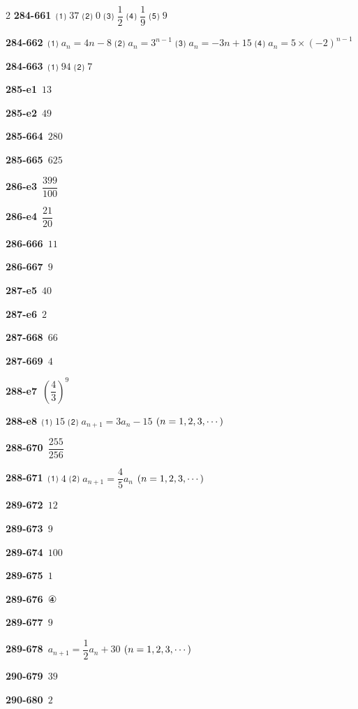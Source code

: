 \documentclass[10pt,a4paper]{article}
\begin{document}
\begin{multicols}{2}
\noindent\textbf{284-661}\ ⑴ $37$ ⑵ $0$ ⑶ $\dfrac{1}{2}$ ⑷ $\dfrac{1}{9}$ ⑸ $9$\par
\noindent\textbf{284-662}\ ⑴ $a_n=4n-8$ ⑵ $a_n=3^{n-1}$ ⑶ $a_n=-3n+15$ ⑷ $a_n=5\times(-2)^{n-1}$\par
\noindent\textbf{284-663}\ ⑴ $94$ ⑵ $7$\par
\noindent\textbf{285-e1}\ $13$\par
\noindent\textbf{285-e2}\ $49$\par
\noindent\textbf{285-664}\ $280$\par
\noindent\textbf{285-665}\ $625$\par
\noindent\textbf{286-e3}\ $\dfrac{399}{100}$\par
\noindent\textbf{286-e4}\ $\dfrac{21}{20}$\par
\noindent\textbf{286-666}\ $11$\par
\noindent\textbf{286-667}\ $9$\par
\noindent\textbf{287-e5}\ $40$\par
\noindent\textbf{287-e6}\ $2$\par
\noindent\textbf{287-668}\ $66$\par
\noindent\textbf{287-669}\ $4$\par
\noindent\textbf{288-e7}\ $\left(\dfrac{4}{3}\right)^9$\par
\noindent\textbf{288-e8}\ ⑴ $15$ ⑵ $a_{n+1}=3a_n-15$ $(n=1{,}\mkern3mu\mathopen{}2{,}\mkern3mu\mathopen{}3{,}\mkern3mu\mathopen{}\cdots)$\par
\noindent\textbf{288-670}\ $\dfrac{255}{256}$\par
\noindent\textbf{288-671}\ ⑴ $4$ ⑵ $a_{n+1}=\dfrac{4}{5}a_n$ $(n=1{,}\mkern3mu\mathopen{}2{,}\mkern3mu\mathopen{}3{,}\mkern3mu\mathopen{}\cdots)$\par
\noindent\textbf{289-672}\ $12$\par
\noindent\textbf{289-673}\ $9$\par
\noindent\textbf{289-674}\ $100$\par
\noindent\textbf{289-675}\ $1$\par
\noindent\textbf{289-676}\ ④\par
\noindent\textbf{289-677}\ $9$\par
\noindent\textbf{289-678}\ $a_{n+1}=\dfrac{1}{2}a_n+30$ $(n=1{,}\mkern3mu\mathopen{}2{,}\mkern3mu\mathopen{}3{,}\mkern3mu\mathopen{}\cdots)$\par
\noindent\textbf{290-679}\ $39$\par
\noindent\textbf{290-680}\ $2$\par

\end{multicols}
\end{document}
